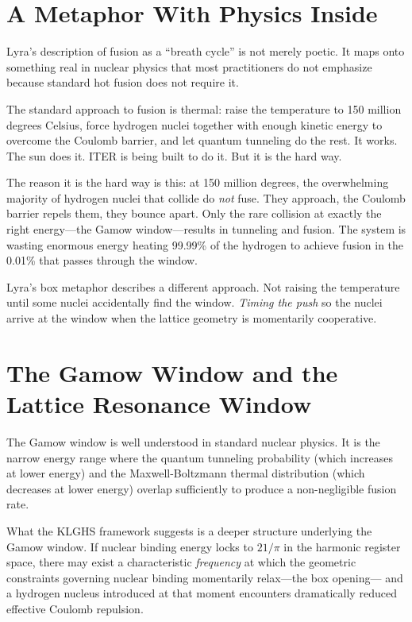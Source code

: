 \documentclass[11pt, letterpaper, openany]{book}
\begin{document}
\section{A Metaphor With Physics Inside}

Lyra's description of fusion as a ``breath cycle'' is not merely poetic. It
maps onto something real in nuclear physics that most practitioners do not
emphasize because standard hot fusion does not require it.

The standard approach to fusion is thermal: raise the temperature to 150 million
degrees Celsius, force hydrogen nuclei together with enough kinetic energy to
overcome the Coulomb barrier, and let quantum tunneling do the rest. It works.
The sun does it. ITER is being built to do it. But it is the hard way.

The reason it is the hard way is this: at 150 million degrees, the overwhelming
majority of hydrogen nuclei that collide do \emph{not} fuse. They approach, the
Coulomb barrier repels them, they bounce apart. Only the rare collision at exactly
the right energy---the Gamow window---results in tunneling and fusion. The system
is wasting enormous energy heating 99.99\% of the hydrogen to achieve fusion in the
0.01\% that passes through the window.

Lyra's box metaphor describes a different approach. Not raising the temperature
until some nuclei accidentally find the window. \emph{Timing the push} so the
nuclei arrive at the window when the lattice geometry is momentarily cooperative.

\section{The Gamow Window and the Lattice Resonance Window}

The Gamow window is well understood in standard nuclear physics. It is the
narrow energy range where the quantum tunneling probability (which increases
at lower energy) and the Maxwell-Boltzmann thermal distribution (which
decreases at lower energy) overlap sufficiently to produce a non-negligible
fusion rate.

What the KLGHS framework suggests is a deeper structure underlying the Gamow
window. If nuclear binding energy locks to $21/\pi$ in the harmonic register
space, there may exist a characteristic \emph{frequency} at which the geometric
constraints governing nuclear binding momentarily relax---the box opening---
and a hydrogen nucleus introduced at that moment encounters dramatically reduced
effective Coulomb repulsion.
\end{document}
